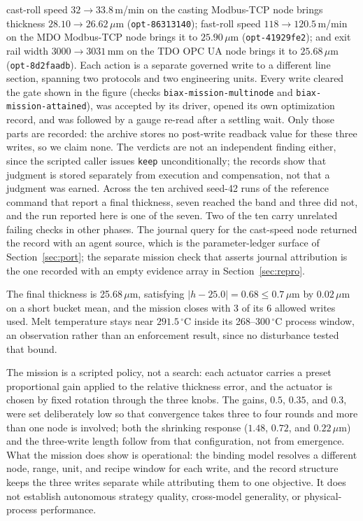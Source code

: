 cast-roll speed $32\rightarrow33.8$\,m/min on the casting Modbus-TCP node brings
thickness $28.10\rightarrow26.62\,\mu$m (\texttt{opt-86313140}); fast-roll speed
$118\rightarrow120.5$\,m/min on the MDO Modbus-TCP node brings it to
$25.90\,\mu$m (\texttt{opt-41929fe2}); and exit rail width $3000\rightarrow3031$\,mm
on the TDO OPC UA node brings it to $25.68\,\mu$m (\texttt{opt-8d2faadb}). Each
action is a separate governed write to a different line section, spanning
two protocols and two engineering units. Every write cleared the gate shown in the figure (checks \texttt{biax-mission-multinode} and \texttt{biax-mission-attained}), was accepted by its driver, opened its own
optimization record, and was followed by a gauge re-read after a settling wait. Only
those parts are recorded: the archive stores no post-write readback value for these
three writes, so we claim none. The verdicts are not an independent finding either,
since the scripted caller issues \texttt{keep} unconditionally; the records show
that judgment is stored separately from execution and compensation, not that a judgment was earned. Across the ten archived seed-42 runs of the reference command that report a final thickness, seven reached the band and three did not, and the run reported here is one of the seven. Two of the ten carry unrelated failing checks in other phases. The journal query for the cast-speed node returned the record with an agent source, which is the parameter-ledger surface of Section~\ref{sec:port}; the separate mission check that asserts journal attribution is the one recorded with an empty evidence array in Section~\ref{sec:repro}.

The final thickness is 25.68\,$\mu$m, satisfying $|h-25.0|=0.68\leq0.7\,\mu$m by
$0.02\,\mu$m on a short bucket mean, and the mission closes with 3 of its 6 allowed
writes used. Melt temperature stays near $291.5\,^\circ$C inside its
268--300\,$^\circ$C process window, an observation rather than an enforcement
result, since no disturbance tested that bound.

The mission is a scripted policy, not a search: each actuator carries a preset
proportional gain applied to the relative thickness error, and the actuator is chosen
by fixed rotation through the three knobs. The gains, $0.5$, $0.35$, and $0.3$, were
set deliberately low so that convergence takes three to four rounds and more than one
node is involved; both the shrinking response ($1.48$, $0.72$, and $0.22\,\mu$m) and
the three-write length follow from that configuration, not from emergence. What the
mission does show is operational: the binding model resolves a different node,
range, unit, and recipe window for each write, and the record structure keeps the
three writes separate while attributing them to one objective. It does not establish
autonomous strategy quality, cross-model generality, or physical-process
performance.

